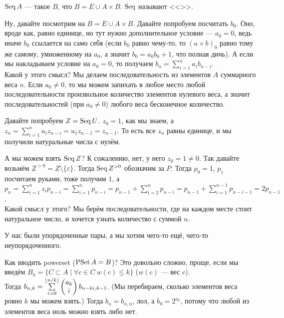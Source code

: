 \documentclass{article}
\begin{document}
\begin{itemize}
\begin{Comment}
        \end{Comment}
        \dfn $\operatorname{Seq} A$ --- такое $B$, что $B=E\cup A\times B$. $\operatorname{Seq}$ называют <<>>.
        \begin{Comment}
            Ну, давайте посмотрим на $B=E\cup A\times B$. Давайте попробуем посчитать $b_0$. Оно, вроде как, равно единице, но тут нужно дополнительное условие --- $a_0=0$, ведь иначе $b_0$ ссылается на само себя (если $b_0$ равно чему-то, то $(a\times b)_0$ равно тому же самому, умноженному на $a_0$, а значит $b_0=a_0b_0+1$, что полная дичь). А если мы накладываем условие на $a_0=0$, то получаем $b_n=\sum\limits_{i=1}^na_ib_{n-i}$.\\
            Какой у этого смысл? Мы делаем последовательность из элементов $A$ суммарного веса $n$. Если $a_0\neq0$, то мы можем запихать в любое место любой последовательности произвольное количество элементов нулевого веса, а значит последовательностей (при $a_0\neq0$) любого веса бесконечное количество.
        \end{Comment}
        \begin{Example}
            Давайте попробуем $Z=\operatorname{Seq} U$. $z_0=1$, как мы знаем, а $z_n=\sum\limits_{i=1}^nu_iz_{n-i}=u_1z_{n-1}=z_{n-1}$. То есть все $z_n$ равны единице, и мы получили натуральные числа с нулём.
        \end{Example}
        \begin{Example}
            А мы можем взять $\operatorname{Seq} Z$? К сожалению, нет, у него $z_0=1\neq0$. Так давайте возьмём $Z^{>0}=Z\setminus\{\varepsilon\}$. Тогда $\operatorname{Seq} Z^{>0}$ обозначим за $P$. Тогда $p_0=1$, $p_1$ посчитаем руками, тоже получим $1$, а $p_n=\sum\limits_{i=1}^nz_ip_{n-i}=\sum\limits_{i=1}^np_{n-i}=p_{n-1}+\sum\limits_{i=2}^np_{n-i}=p_{n-1}+\sum\limits_{i=1}^{n-1}p_{n-i-1}=2p_{n-1}$.\\
            Какой смысл у этого? Мы берём последовательности, где на каждом месте стоит натуральное число, и хочется узнать количество с суммой $n$.
        \end{Example}
        \begin{Comment}
            У нас были упорядоченные пары, а мы хотим чего-то ещё, чего-то неупорядоченного.
        \end{Comment}
        \begin{Comment}
            Как вводить powerset ($\operatorname{PSet} A=B$)? Это довольно сложно, проще, если мы введём $B_k=\{C\subset A\mid \forall c\in C~w(c)\leqslant k\}$ ($w(c)$ --- вес $c$).\\
            Тогда $b_{n,k}=\sum\limits_{i=0}^{\lfloor n/k\rfloor}\left(\begin{matrix}a_k\\i\end{matrix}\right)b_{n-ki,k-1}$. (Мы перебираем, сколько элементов веса ровно $k$ мы можем взять.) Тогда $b_n=b_{n,n}$, лол, а $b_0=2^{a_0}$, потому что любой из элементов веса ноль можно взять либо нет.

\end{Comment}
\end{itemize}
\end{document}
